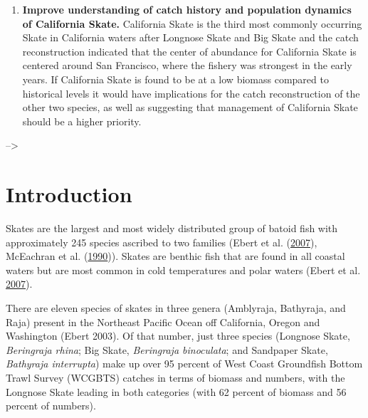 \documentclass[12pt,]{article}
\begin{document}
\begin{enumerate}
\item \textbf{Improve understanding of catch history and population dynamics of California Skate.} California Skate is the third most commonly occurring Skate in California waters after Longnose Skate and Big Skate and the catch reconstruction indicated that the center of abundance for California Skate is centered around San Francisco, where the fishery was strongest in the early years. If California Skate is found to be at a low biomass compared to historical levels it would have implications for the catch reconstruction of the other two species, as well as suggesting that management of California Skate should be a higher priority.

\end{enumerate}

\FloatBarrier

\newpage
\renewcommand{\thefigure}{\arabic{figure}}
\renewcommand{\thetable}{\arabic{table}}
\setcounter{figure}{0}
\setcounter{table}{0}

\newpage
{}

\setcounter{page}{1}--\textgreater{}

\renewcommand{\thefigure}{\arabic{figure}}
\renewcommand{\thetable}{\arabic{table}}
\setcounter{figure}{0}
\setcounter{table}{0}

\hypertarget{introduction}{%
\section{Introduction}\label{introduction}}

Skates are the largest and most widely distributed group of batoid fish
with approximately 245 species ascribed to two families (Ebert et al.
(\protect\hyperlink{ref-Ebert2007}{2007}), McEachran et al.
(\protect\hyperlink{ref-McEachran1990}{1990})). Skates are benthic fish
that are found in all coastal waters but are most common in cold
temperatures and polar waters (Ebert et al.
\protect\hyperlink{ref-Ebert2007}{2007}).

There are eleven species of skates in three genera (Amblyraja,
Bathyraja, and Raja) present in the Northeast Pacific Ocean off
California, Oregon and Washington (Ebert 2003). Of that number, just
three species (Longnose Skate, \emph{Beringraja rhina}; Big Skate,
\emph{Beringraja binoculata}; and Sandpaper Skate, \emph{Bathyraja
interrupta}) make up over 95 percent of West Coast Groundfish Bottom
Trawl Survey (WCGBTS) catches in terms of biomass and numbers, with the
Longnose Skate leading in both categories (with 62 percent of biomass
and 56 percent of numbers).
\end{document}
